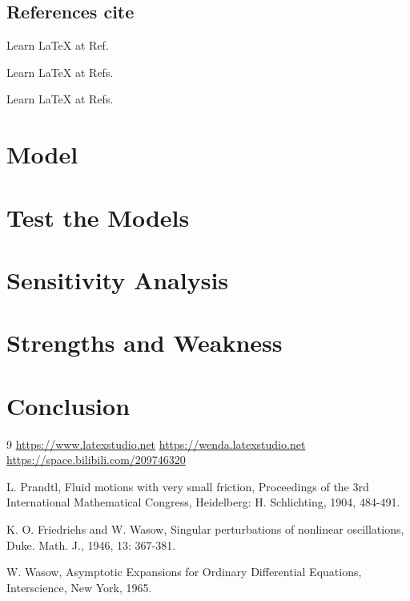 \documentclass{swmcmthesis}
\begin{document}
\subsection{References cite}
Learn \LaTeX{} at Ref.\cite{bib:one}

Learn \LaTeX{} at Refs.\cite{bib:one,bib:two}

Learn \LaTeX{} at Refs.\cite{bib:one,bib:two,vedio,bib4}

\section{Model}
\lipsum[1-2]

\section{Test the Models}
\lipsum[1-2]

\section{Sensitivity Analysis}
\lipsum[1-2]

\section{Strengths and Weakness}
\lipsum[1-2]

\section{Conclusion}
\lipsum[1-2]


\begin{thebibliography}{9}%
 \url{https://www.latexstudio.net}
 \url{https://wenda.latexstudio.net} 
 \url{https://space.bilibili.com/209746320} 

 L. Prandtl, Fluid motions with very small friction, Proceedings of the 3rd International Mathematical Congress, Heidelberg: H. Schlichting, 1904, 484-491.

 K. O. Friedriehs and W. Wasow, Singular perturbations of nonlinear oscillations, Duke. Math. J., 1946, 13: 367-381.

 W. Wasow, Asymptotic Expansions for Ordinary Differential Equations, Interscience, New York, 1965.
\end{thebibliography}
\end{document}

